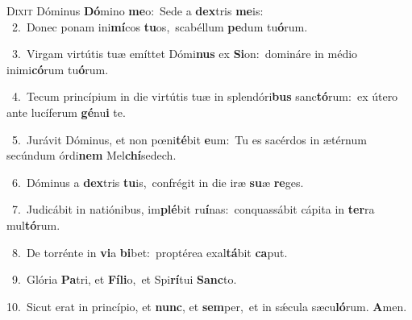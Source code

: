\lettrine{\initial\textcolor{\initialcolor}{D}}{ixit} Dóminus \textbf{Dó}\-mino \textbf{me}\-o:~\star Sede a \textbf{dex}\-tris \textbf{me}\-is:\\
{\numbfont\textcolor{\numbcolor}{~2.}}~Donec ponam ini\-\textbf{mí}\-cos \textbf{tu}\-os,~\star scabéllum \textbf{pe}\-dum tu\-\textbf{ó}\-rum.\par
{\numbfont\textcolor{\numbcolor}{~3.}}~Virgam virtútis tuæ emíttet Dómi\textbf{nus} ex \textbf{Si}\-on:~\star domináre in médio inimi\-\textbf{có}\-rum tu\-\textbf{ó}\-rum.\par
{\numbfont\textcolor{\numbcolor}{~4.}}~Tecum princípium in die virtútis tuæ in splendóri\textbf{bus} sanc\-\textbf{tó}\-rum:~\star ex útero ante lucíferum \textbf{gé}\-nu\textbf{i} te.\par
{\numbfont\textcolor{\numbcolor}{~5.}}~Jurávit Dóminus, et non pœni\-\textbf{té}\-bit \textbf{e}\-um:~\star Tu es sacérdos in ætérnum secúndum órdi\textbf{nem} Mel\-\textbf{chí}\-sedech.\par
{\numbfont\textcolor{\numbcolor}{~6.}}~Dóminus a \textbf{dex}\-tris \textbf{tu}\-is,~\star confrégit in die iræ \textbf{su}\-æ \textbf{re}\-ges.\par
{\numbfont\textcolor{\numbcolor}{~7.}}~Judicábit in natiónibus, im\-\textbf{plé}\-bit ru\-\textbf{í}\-nas:~\star conquassábit cápita in \textbf{ter}\-ra mul\-\textbf{tó}\-rum.\par
{\numbfont\textcolor{\numbcolor}{~8.}}~De torrénte in \textbf{vi}\-a \textbf{bi}\-bet:~\star proptérea exal\-\textbf{tá}\-bit \textbf{ca}\-put.\par
{\numbfont\textcolor{\numbcolor}{~9.}}~Glória \textbf{Pa}\-tri, et \textbf{Fí}\-\textbf{li}o,~\star et Spi\-\textbf{rí}\-tui \textbf{Sanc}\-to.\par
{\numbfont\textcolor{\numbcolor}{10.}}~Sicut erat in princípio, et \textbf{nunc}\-, et \textbf{sem}\-per,~\star et in sǽcula sæcu\-\textbf{ló}\-rum. \textbf{A}\-men.\par
